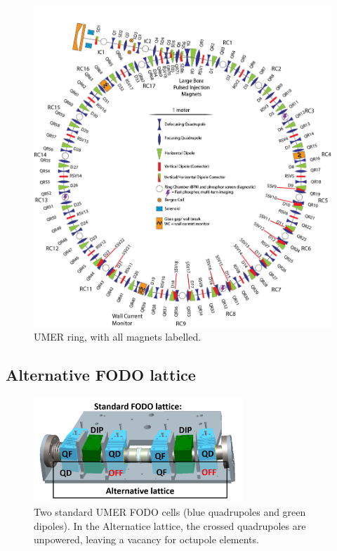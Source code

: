 \begin{figure}[]
   \centering
   \includegraphics[width=\textwidth]{umer-diagram/full_ring.png}
   \caption{UMER ring, with all magnets labelled.}
   \label{fig:umerring}
\end{figure}

\subsection{Alternative FODO lattice}

\begin{figure}[]
   \centering
   \includegraphics[width=0.7\textwidth]{3.figures/UMER_FODO.png}
   \caption{Two standard UMER FODO cells (blue quadrupoles and green dipoles). In the Alternatice lattice, the crossed quadrupoles are unpowered, leaving a vacancy for octupole elements.}
   \label{fig:FODOcell}
\end{figure}

